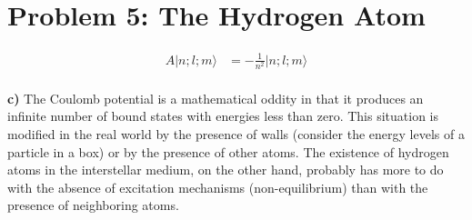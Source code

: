 \documentclass{article}
\begin{document}
\setcounter{section}{4}
\section*{Problem 5: The Hydrogen Atom}

\begin{equation*}
\begin{split}
A |n;l;m \rangle &= -\frac{1}{n^2} |n;l;m \rangle  \\
\end{split}
\end{equation*}

\noindent \textbf{c)} The Coulomb potential is a mathematical oddity in that it produces an infinite number of bound states with energies less than zero. This situation is modified in the real world by the presence of walls (consider the energy levels of a particle in a box) or by the presence of other atoms. The existence of hydrogen atoms in the interstellar medium, on the other hand, probably has more to do with the absence of excitation mechanisms (non-equilibrium) than with the presence of neighboring atoms.
\end{document}
